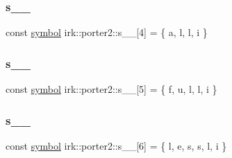 \mbox{\label{namespaceirk_1_1porter2_a40ab885a33df5ab34ee06cc788d37de3}} 
\subsubsection{\texorpdfstring{s\+\_\+\_}{s\_5\_6}}
{\footnotesize\ttfamily const \mbox{\hyperlink{namespaceirk_1_1porter2_afd04c4eb58a1dabcf8f3ab2d7e9f9ed5}{symbol}} irk\+::porter2\+::s\+\_\+\_\mbox{[}4\mbox{]} = \{ \textquotesingle{}a\textquotesingle{}, \textquotesingle{}l\textquotesingle{}, \textquotesingle{}l\textquotesingle{}, \textquotesingle{}i\textquotesingle{} \}\hspace{0.3cm}{\ttfamily [static]}}

\mbox{\label{namespaceirk_1_1porter2_a5d491b21481c7219aff46a7127cbca55}} 
\subsubsection{\texorpdfstring{s\+\_\+\_}{s\_5\_7}}
{\footnotesize\ttfamily const \mbox{\hyperlink{namespaceirk_1_1porter2_afd04c4eb58a1dabcf8f3ab2d7e9f9ed5}{symbol}} irk\+::porter2\+::s\+\_\+\_\mbox{[}5\mbox{]} = \{ \textquotesingle{}f\textquotesingle{}, \textquotesingle{}u\textquotesingle{}, \textquotesingle{}l\textquotesingle{}, \textquotesingle{}l\textquotesingle{}, \textquotesingle{}i\textquotesingle{} \}\hspace{0.3cm}{\ttfamily [static]}}

\mbox{\label{namespaceirk_1_1porter2_a851d6a8e9abafca9a3c4fa573111caf9}} 
\subsubsection{\texorpdfstring{s\+\_\+\_}{s\_5\_8}}
{\footnotesize\ttfamily const \mbox{\hyperlink{namespaceirk_1_1porter2_afd04c4eb58a1dabcf8f3ab2d7e9f9ed5}{symbol}} irk\+::porter2\+::s\+\_\+\_\mbox{[}6\mbox{]} = \{ \textquotesingle{}l\textquotesingle{}, \textquotesingle{}e\textquotesingle{}, \textquotesingle{}s\textquotesingle{}, \textquotesingle{}s\textquotesingle{}, \textquotesingle{}l\textquotesingle{}, \textquotesingle{}i\textquotesingle{} \}\hspace{0.3cm}{\ttfamily [static]}}

